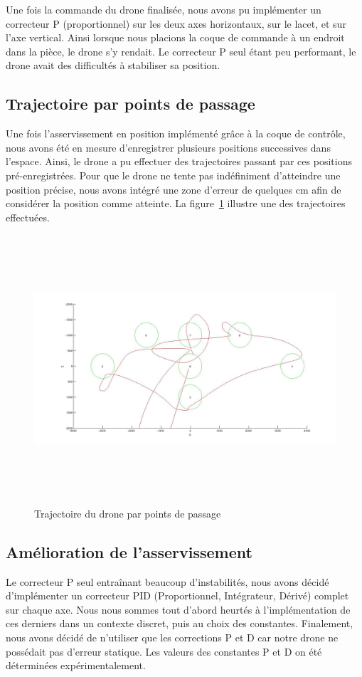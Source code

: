            Une fois la commande du drone finalisée, nous avons pu implémenter un correcteur P (proportionnel) sur les deux axes horizontaux, sur le lacet, et sur l'axe vertical. Ainsi lorsque nous placions la coque de commande à un endroit dans la pièce, le drone s'y rendait. Le correcteur P seul étant peu performant, le drone avait des difficultés à stabiliser sa position.

        \subsection{Trajectoire par points de passage}
            Une fois l'asservissement en position implémenté grâce à la coque de contrôle, nous avons été en mesure d'enregistrer plusieurs positions successives dans l'espace. Ainsi, le drone a pu effectuer des trajectoires passant par ces positions pré-enregistrées. Pour que le drone ne tente pas indéfiniment d'atteindre une position précise, nous avons intégré une zone d'erreur de quelques cm afin de considérer la position comme atteinte. La figure~\ref{fig:trajectoire_drone} illustre une des trajectoires effectuées.

            \begin{figure}[h]
              \centering
              \includegraphics[height=10cm]{images/trajectoire.jpg}
              \caption{Trajectoire du drone par points de passage}
              \label{fig:trajectoire_drone}
            \end{figure}

        \subsection{Amélioration de l'asservissement}
            Le correcteur P seul entraînant beaucoup d'instabilités, nous avons décidé d'implémenter un correcteur PID (Proportionnel, Intégrateur, Dérivé) complet sur chaque axe. Nous nous sommes tout d'abord heurtés à l'implémentation de ces derniers dans un contexte discret, puis au choix des constantes. Finalement, nous avons décidé de n'utiliser que les corrections P et D car notre drone ne possédait pas d'erreur statique. Les valeurs des constantes P et D on été déterminées expérimentalement.
